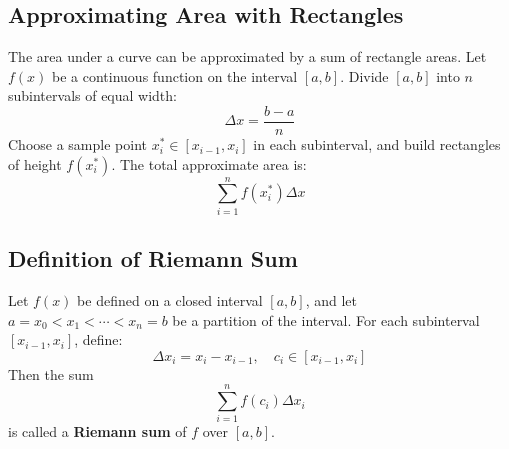 \documentclass[11pt]{article}
\begin{document}
\subsection{Approximating Area with Rectangles}
The area under a curve can be approximated by a sum of rectangle areas. Let $f(x)$ be a continuous function on the interval $[a, b]$. Divide $[a, b]$ into $n$ subintervals of equal width:
\[
    \Delta x = \frac{b - a}{n}
\]
Choose a sample point $x_i^* \in [x_{i-1}, x_i]$ in each subinterval, and build rectangles of height $f(x_i^*)$. The total approximate area is:
\[
    \sum_{i=1}^n f(x_i^*) \Delta x
\]
\begin{center}
\end{center}
\subsection{Definition of Riemann Sum}
Let $f(x)$ be defined on a closed interval $[a, b]$, and let $a = x_0 < x_1 < \cdots < x_n = b$ be a partition of the interval. For each subinterval $[x_{i-1}, x_i]$, define:
\[
    \Delta x_i = x_i - x_{i-1}, \quad c_i \in [x_{i-1}, x_i]
\]
Then the sum
\[
    \sum_{i=1}^n f(c_i) \Delta x_i
\]
is called a \textbf{Riemann sum} of $f$ over $[a, b]$.
\end{document}
